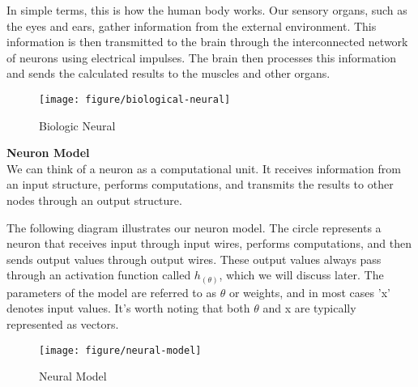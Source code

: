 \documentclass{article}
\begin{document}
    In simple terms, this is how the human body works. Our sensory organs, such as the eyes and ears, gather information from the external environment. This information is then transmitted to the brain through the interconnected network of neurons using electrical impulses. The brain then processes this information and sends the calculated results to the muscles and other organs. \\
    
    \begin{figure}[htbp]
        \centering
        \texttt{[image: figure/biological-neural]}
        \caption{Biologic Neural}
     \end{figure}
    
    
    \noindent
    \textbf{Neuron Model}\\
    We can think of a neuron as a computational unit. It receives information from an input structure, performs computations, and transmits the results to other nodes through an output structure.

    The following diagram illustrates our neuron model. The circle represents a neuron that receives input through input wires, performs computations, and then sends output values through output wires. These output values always pass through an activation function called $h_(\theta)$, which we will discuss later. The parameters of the model are referred to as $\theta$ or weights, and in most cases 'x' denotes input values. It's worth noting that both $\theta$ and x are typically represented as vectors.


    \begin{figure}[htbp]
        \centering
        \texttt{[image: figure/neural-model]}
        \caption{Neural Model}
     \end{figure}
\end{document}
